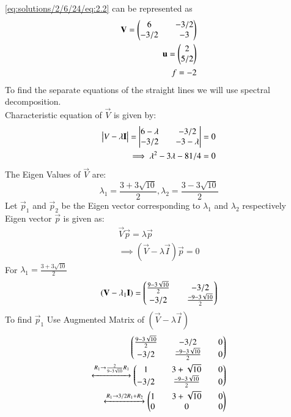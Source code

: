 \eqref{eq:solutions/2/6/24/eq:2.2} can be represented as 
\begin{equation} \label{eq:solutions/2/6/24/eq:2.8}
\begin{split}
\mathbf{V}=\begin{pmatrix}6 && -3/2\\ -3/2 && -3\end{pmatrix}\\
\mathbf{u}=\begin{pmatrix}2\\5/2\end{pmatrix}\\
f= -2
\end{split}
\end{equation}
To find the separate equations of the straight lines we will use spectral decomposition.\\
Characteristic equation of $\vec{V}$ is given by:
\begin{equation} \label{eq:solutions/2/6/24/eq:2.9}
\begin{split}
\begin{vmatrix}V-\lambda \mathbf{I}\end{vmatrix}=\begin{vmatrix}6-\lambda && -3/2\\ -3/2 && -3-\lambda\end{vmatrix} = 0\\
\implies \lambda^2 - 3\lambda - 81/4 = 0
\end{split}
\end{equation}
The Eigen Values of $\vec{V}$ are:
\begin{equation} \label{eq:solutions/2/6/24/eq:2.10}
\lambda_1 = \frac{3+3\sqrt{10}}{2}, \lambda_2 = \frac{3-3\sqrt{10}}{2}
\end{equation}
Let $\vec{p}_1$ and $\vec{p}_2$ be the Eigen vector corresponding to $\lambda_1$ and $\lambda_2$ respectively\\
Eigen vector $\vec{p}$ is given as:
\begin{equation} \label{eq:solutions/2/6/24/eq:2.11}
\begin{split}
\vec{V}\vec{p} = \lambda\vec{p}\\
\implies (\vec{V} - \lambda \vec{I})\vec{p} = 0
\end{split}
\end{equation}
For $\lambda_1 = \frac{3+3\sqrt{10}}{2}$
\begin{equation}\label{eq:solutions/2/6/24/eq:2.12}
(\mathbf{V} - \lambda_1 \mathbf{I}) = \begin{pmatrix}\frac{9-3\sqrt{10}}{2} && -3/2\\ -3/2 && \frac{-9-3\sqrt{10}}{2}\end{pmatrix}
\end{equation}
To find $ \vec{p}_1 $ Use Augmented Matrix of $(\vec{V} - \lambda \vec{I})$
\begin{equation} \label{eq:solutions/2/6/24/eq:2.13}
\begin{split}
 \begin{pmatrix}\frac{9-3\sqrt{10}}{2} && -3/2 && 0\\ -3/2 && \frac{-9-3\sqrt{10}}{2} && 0\end{pmatrix}\\
\xleftrightarrow[]{R_1\rightarrow \frac{2}{9-3\sqrt{10}}R_1} 
\begin{pmatrix}1 && 3+\sqrt{10} && 0\\ -3/2 && \frac{-9-3\sqrt{10}}{2} && 0\end{pmatrix}\\
\xleftrightarrow[]{R_1\rightarrow 3/2R_1+R_2} 
\begin{pmatrix}1 && 3+\sqrt{10} && 0\\ 0 && 0 && 0\end{pmatrix} 
\end{split}
\end{equation}
